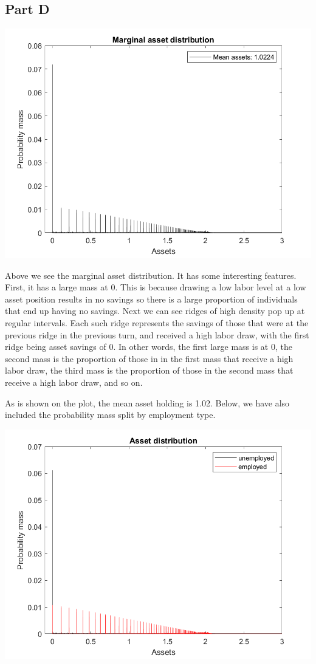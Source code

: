 \documentclass[11pt]{article} %
\begin{document}
\subsection{Part D}

\includegraphics{marginal}

Above we see the marginal asset distribution. It has some interesting features. First, it has a large mass at $0$. This is because drawing a low labor level at a low asset position results in no savings so there is a large proportion of individuals that end up having no savings. Next we can see ridges of high density pop up at regular intervals. Each such ridge represents the savings of those that were at the previous ridge in the previous turn, and received a high labor draw, with the first ridge being asset savings of 0. In other words, the first large mass is at 0, the second mass is the proportion of those in in the first mass that receive a high labor draw, the third mass is the proportion of those in the second mass that receive a high labor draw, and so on.

As is shown on the plot, the mean asset holding is 1.02. Below, we have also included the probability mass split by employment type.

\includegraphics{asdist}
\end{document}
